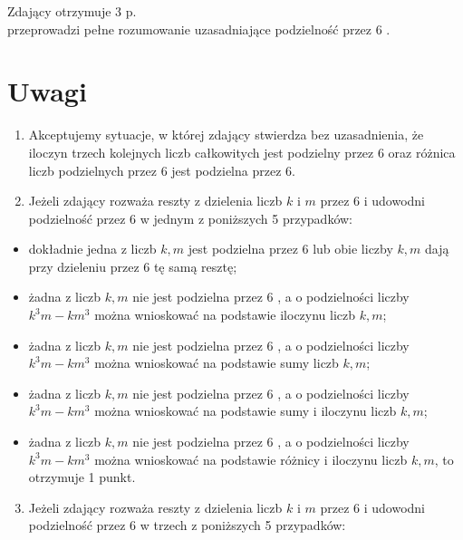 \documentclass[10pt]{article}
\begin{document}
Zdający otrzymuje 3 p.\\
przeprowadzi pełne rozumowanie uzasadniające podzielność przez 6 .

\section*{Uwagi}
\begin{enumerate}
  \item Akceptujemy sytuacje, w której zdający stwierdza bez uzasadnienia, że iloczyn trzech kolejnych liczb całkowitych jest podzielny przez 6 oraz różnica liczb podzielnych przez 6 jest podzielna przez 6.
  \item Jeżeli zdający rozważa reszty z dzielenia liczb $k$ i $m$ przez 6 i udowodni podzielność przez 6 w jednym z poniższych 5 przypadków:
\end{enumerate}

\begin{itemize}
  \item dokładnie jedna z liczb $k, m$ jest podzielna przez 6 lub obie liczby $k, m$ dają przy dzieleniu przez 6 tę samą resztę;
  \item żadna z liczb $k, m$ nie jest podzielna przez 6 , a o podzielności liczby $k^{3} m-k m^{3}$ można wnioskować na podstawie iloczynu liczb $k, m$;
  \item żadna z liczb $k, m$ nie jest podzielna przez 6 , a o podzielności liczby $k^{3} m-k m^{3}$ można wnioskować na podstawie sumy liczb $k, m$;
  \item żadna z liczb $k, m$ nie jest podzielna przez 6 , a o podzielności liczby $k^{3} m-k m^{3}$ można wnioskować na podstawie sumy i iloczynu liczb $k, m$;
  \item żadna z liczb $k, m$ nie jest podzielna przez 6 , a o podzielności liczby $k^{3} m-k m^{3}$ można wnioskować na podstawie różnicy i iloczynu liczb $k, m$, to otrzymuje 1 punkt.
\end{itemize}

\begin{enumerate}
  \setcounter{enumi}{2}
  \item Jeżeli zdający rozważa reszty z dzielenia liczb $k$ i $m$ przez 6 i udowodni podzielność przez 6 w trzech z poniższych 5 przypadków:
\end{enumerate}
\end{document}
